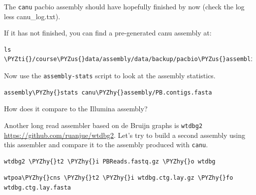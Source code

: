 \documentclass[11pt]{article}
\makeatletter
\def\PYZus{\char`\_}
\def\PYZhy{\char`\-}
\def\PYZti{\char`\~}
\newcommand{\boxspacing}{\kern\kvtcb@left@rule\kern\kvtcb@boxsep}
\newcommand{\prompt}[4]{
        {\ttfamily\llap{{\color{#2}[#3]:\hspace{3pt}#4}}\vspace{-\baselineskip}}
    }
\makeatother
\begin{document}
The \texttt{canu} pacbio assembly should have hopefully finished by now
(check the log less canu\_log.txt).

If it has not finished, you can find a pre-generated canu assembly at:

    \begin{tcolorbox}[breakable, size=fbox, boxrule=1pt, pad at break*=1mm,colback=cellbackground, colframe=cellborder]
\prompt{In}{incolor}{ }{\boxspacing}
\begin{Verbatim}[commandchars=\\\{\}]
ls \PYZti{}/course\PYZus{}data/assembly/data/backup/pacbio\PYZus{}assemblies
\end{Verbatim}
\end{tcolorbox}

    Now use the \texttt{assembly-stats} script to look at the assembly
statistics.

    \begin{tcolorbox}[breakable, size=fbox, boxrule=1pt, pad at break*=1mm,colback=cellbackground, colframe=cellborder]
\prompt{In}{incolor}{ }{\boxspacing}
\begin{Verbatim}[commandchars=\\\{\}]
assembly\PYZhy{}stats canu\PYZhy{}assembly/PB.contigs.fasta
\end{Verbatim}
\end{tcolorbox}

    How does it compare to the Illumina assembly?

    Another long read assembler based on de Bruijn graphs is \texttt{wtdbg2}
\url{https://github.com/ruanjue/wtdbg2}. Let's try to build a second
assembly using this assembler and compare it to the assembly produced
with \texttt{canu}.

    \begin{tcolorbox}[breakable, size=fbox, boxrule=1pt, pad at break*=1mm,colback=cellbackground, colframe=cellborder]
\prompt{In}{incolor}{ }{\boxspacing}
\begin{Verbatim}[commandchars=\\\{\}]
wtdbg2 \PYZhy{}t2 \PYZhy{}i PBReads.fastq.gz \PYZhy{}o wtdbg
\end{Verbatim}
\end{tcolorbox}

    \begin{tcolorbox}[breakable, size=fbox, boxrule=1pt, pad at break*=1mm,colback=cellbackground, colframe=cellborder]
\prompt{In}{incolor}{ }{\boxspacing}
\begin{Verbatim}[commandchars=\\\{\}]
wtpoa\PYZhy{}cns \PYZhy{}t2 \PYZhy{}i wtdbg.ctg.lay.gz \PYZhy{}fo wtdbg.ctg.lay.fasta
\end{Verbatim}
\end{tcolorbox}
\end{document}
